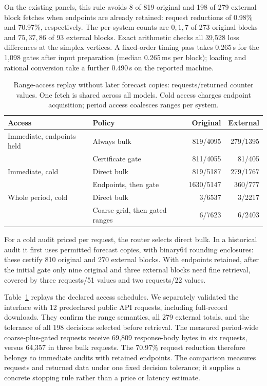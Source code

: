 On the existing panels, this rule avoids 8 of 819 original and 198 of 279
external block fetches when endpoints are already retained: request reductions
of 0.98\% and 70.97\%, respectively. The per-system counts are $0,1,7$ of
273 original blocks and $75,37,86$ of 93 external blocks. Exact arithmetic
checks all 39,528 loss differences at the simplex vertices. A fixed-order
timing pass takes 0.265\,s for the 1,098 gates after input preparation
(median 0.265\,ms per block); loading and rational conversion take a further
0.490\,s on the reported machine.

\begin{table}[htbp]
\centering\small
\caption{Range-access replay without later forecast copies:
requests/returned counter values. One fetch is
shared across all models. Cold access charges endpoint acquisition; period
access coalesces ranges per system.}
\label{tab:retrieval-gate-cost}
\begin{tabular}{llrr}
\toprule
Access & Policy & Original & External\\
\midrule
Immediate, endpoints held & Always bulk & 819/4095 & 279/1395\\
                         & Certificate gate & 811/4055 & 81/405\\
Immediate, cold          & Direct bulk & 819/5187 & 279/1767\\
                         & Endpoints, then gate & 1630/5147 & 360/777\\
Whole period, cold       & Direct bulk & 3/6537 & 3/2217\\
                         & Coarse grid, then gated ranges & 6/7623 & 6/2403\\
\bottomrule
\end{tabular}
\end{table}

For a cold audit priced per request, the router selects direct bulk. In a
historical audit it first uses permitted forecast copies, with binary64
rounding enclosures: these certify 810 original and 270 external blocks.
With endpoints retained, after the initial gate only nine original and three external blocks need
fine retrieval, covered by three requests/51 values and two requests/22 values.

Table~\ref{tab:retrieval-gate-cost} replays the declared access schedules.
We separately validated the interface with 12 predeclared public API requests,
including full-record downloads. They confirm the range semantics, all 279
external totals, and the tolerance of all 198 decisions selected before
retrieval. The measured period-wide coarse-plus-gated requests receive 69,809
response-body bytes in six requests, versus 64,357 in three bulk requests.
The 70.97\% request reduction therefore belongs to immediate audits with
retained endpoints. The comparison measures requests and returned data under
one fixed decision tolerance; it supplies a concrete stopping rule rather
than a price or latency estimate.

